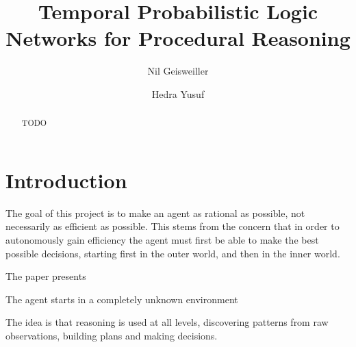 \documentclass[runningheads]{llncs}
\begin{document}
%
\title{Temporal Probabilistic Logic Networks for Procedural Reasoning}

%
\author{Nil Geisweiller
  \and Hedra Yusuf}
%
%
%
\maketitle              %
%

\begin{abstract}
  TODO

\end{abstract}

\section{Introduction}
\label{sec:intro}
The goal of this project is to make an agent as rational as possible,
not necessarily as efficient as possible.  This stems from the concern
that in order to autonomously gain efficiency the agent must first be
able to make the best possible decisions, starting first in the outer
world, and then in the inner world.


The paper presents

The agent starts in a completely unknown environment

The idea is that reasoning is used at all levels, discovering patterns
from raw observations, building plans and making decisions.
\end{document}
